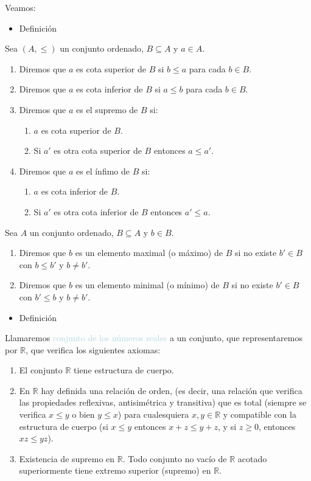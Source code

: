 \documentclass[12pt]{article}
\begin{document}
Veamos:
\begin{itemize}[label=\color{red}\textbullet, leftmargin=*]
	\item \color{lightblue} Definición
\end{itemize}
Sea $(A,\le)$ un conjunto ordenado, $B\subseteq A$ y $a\in A$.
\begin{enumerate}[label=\arabic*)]
	\item Diremos que $a$ es cota superior de $B$ si $b\le a$ para cada $b\in B$.
	\item Diremos que $a$ es cota inferior de $B$ si $a\le b$ para cada $b\in B$.
	\item Diremos que $a$ es el supremo de $B$ si:
	\begin{enumerate}[label=\arabic*)]
		\item $a$ es cota superior de $B$.
		\item Si $a'$ es otra cota superior de $B$ entonces $a\le a'$.
	\end{enumerate}
	\item Diremos que $a$ es el ínfimo de $B$ si:
	\begin{enumerate}[label=\arabic*)]
		\item $a$ es cota inferior de $B$.
		\item Si $a'$ es otra cota inferior de $B$ entonces $a'\le a$.
	\end{enumerate}
\end{enumerate}
Sea $A$ un conjunto ordenado, $B\subseteq A$ y $b\in B$.
\begin{enumerate}[label=\arabic*)]
	\item Diremos que $b$ es un elemento maximal (o máximo) de $B$ si no existe $b'\in B$ con $b\le b'$ y $b\neq b'$.
	\item Diremos que $b$ es un elemento minimal (o mínimo) de $B$ si no existe $b'\in B$ con $b'\le b$ y $b\neq b'$.
\end{enumerate}
\begin{itemize}[label=\color{red}\textbullet, leftmargin=*]
	\item \color{lightblue} Definición
\end{itemize} 
Llamaremos \textcolor{lightblue}{conjunto de los números reales} a un conjunto, que representaremos por $\mathbb{R}$, que verifica los siguientes axiomas:
\begin{enumerate}[label=\arabic*)]
	\item El conjunto $\mathbb{R}$ tiene estructura de cuerpo.
	\item En $\mathbb{R}$ hay definida una relación de orden, (es decir, una relación que verifica las propiedades reflexivas, antisimétrica y transitiva) que es total (siempre se verifica $x\le y$ o bien $y\le x$) para cualesquiera $x,y\in\mathbb{R}$ y compatible con la estructura de cuerpo (si $x\le y$ entonces $x+z\le y+z$, y si $z\ge0$, entonces $xz\le yz$).
	\item Existencia de supremo en $\mathbb{R}$. Todo conjunto no vacío de $\mathbb{R}$ acotado superiormente tiene extremo superior (supremo) en $\mathbb{R}$.
\end{enumerate}
\end{document}
